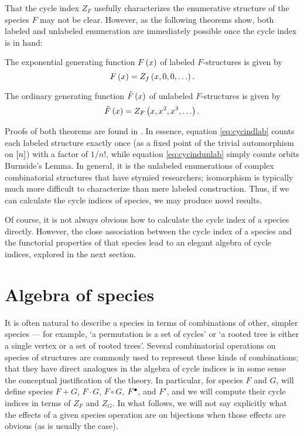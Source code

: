 \documentclass[sectionflow,singlespace,twoside]{brandiss} %
\numberwithin{section}{chapter}
\numberwithin{figure}{chapter}
\begin{document}
That the cycle index $Z_{F}$ usefully characterizes the enumerative structure of the species $F$ may not be clear.
However, as the following theorems show, both labeled and unlabeled enumeration are immediately possible once the cycle index is in hand:
\begin{theorem}\label{thm:cycindlab}
  The exponential generating function $F \left( {x} \right)$ of labeled $F$-structures is given by
  \begin{equation}\label{eq:cycindlab}
    F \left( {x} \right) = Z_{f} \left( {x, 0, 0, \dots} \right).
  \end{equation}
\end{theorem}
\begin{theorem}\label{thm:cycindunlab}
  The ordinary generating function $\tilde{F} \left( {x} \right)$ of unlabeled $F$-structures is given by
  \begin{equation}\label{eq:cycindunlab}
    \tilde{F} \left( {x} \right) = Z_{F} \left( {x, x^{2}, x^{3}, \dots} \right).
  \end{equation}
\end{theorem}
Proofs of both theorems are found in \cite[\S 1.2]{bll:species}.
In essence, equation \eqref{eq:cycindlab} counts each labeled structure exactly once (as a fixed point of the trivial automorphism on $\left[ {n} \right]$) with a factor of $1/n!$, while equation \eqref{eq:cycindunlab} simply counts orbits  Burnside's Lemma.
In general, it is the unlabeled enumerations of complex combinatorial structures that have stymied researchers; isomorphism is typically much more difficult to characterize than mere labeled construction. Thus, if we can calculate the cycle indices of species, we may produce novel results.

Of course, it is not always obvious how to calculate the cycle index of a species directly.
However, the close association between the cycle index of a species and the functorial properties of that species lead to an elegant algebra of cycle indices, explored in the next section.

\section{Algebra of species}\label{s:specalg}
It is often natural to describe a species in terms of combinations of other, simpler species --- for example, `a permutation is a set of cycles' or `a rooted tree is either a single vertex or a set of rooted trees'.
Several combinatorial operations on species of structures are commonly used to represent these kinds of combinations; that they have direct analogues in the algebra of cycle indices is in some sense the conceptual justification of the theory.
In particular, for species $F$ and $G$, will define species $F + G$, $F \cdot G$, $F \circ G$, ${F}^{\bullet }$, and $F'$, and we will compute their cycle indices in terms of $Z_{F}$ and $Z_{G}$.
In what follows, we will not say explicitly what the effects of a given species operation are on bijections when those effects are obvious (as is usually the case).
\end{document}
